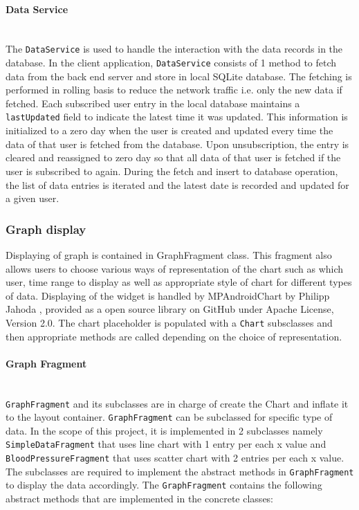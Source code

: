 \paragraph{Data Service} \mbox{} \\
The \texttt{DataService} is used to handle the interaction with the data records in the database. In the client
application, \texttt{DataService} consists of 1 method to fetch data from the back end server and store in local SQLite
database. The fetching is performed in rolling basis to reduce the network traffic i.e. only the new data if fetched.
Each subscribed user entry in the local database maintains a \texttt{lastUpdated} field to indicate the latest time it
was updated.  This information is initialized to a zero day when the user is created and updated every time the data of
that user is fetched from the database. Upon unsubscription, the entry is cleared and reassigned to zero day so that all
data of that user is fetched if the user is subscribed to again. During the fetch and insert to database operation, the
list of data entries is iterated and the latest date is recorded and updated for a given user.

\subsubsection{Graph display}
Displaying of graph is contained in GraphFragment class. This fragment also allows users to choose various ways of
representation of the chart such as which user, time range to display as well as appropriate style of chart for
different types of data. Displaying of the widget is handled by MPAndroidChart by Philipp Jahoda \cite{MPAndroidChart},
provided as a open source library on GitHub under Apache License, Version 2.0. The chart placeholder is populated with a
\texttt{Chart} subsclasses and then appropriate methods are called depending on the choice of representation.

\paragraph{Graph Fragment}\mbox{} \\
\texttt{GraphFragment} and its subclasses are in charge of create the Chart and inflate it to the layout container.
\texttt{GraphFragment} can be subclassed for specific type of data. In the scope of this project, it is implemented in 2
subclasses namely \texttt{SimpleDataFragment} that uses line chart with 1 entry per each x value and
\texttt{BloodPressureFragment} that uses scatter chart with 2 entries per each x value. The subclasses are required to
implement the abstract methods in \texttt{GraphFragment} to display the data accordingly.  The \texttt{GraphFragment}
contains the following abstract methods that are implemented in the concrete classes:

